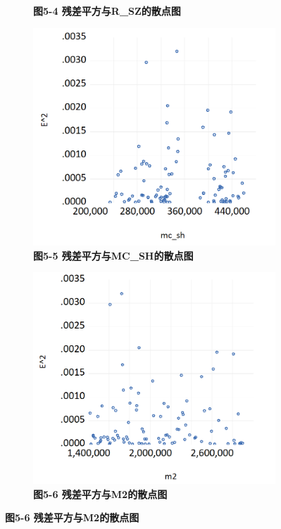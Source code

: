 \documentclass[12pt, a4paper]{article}
\numberwithin{equation}{section}
\begin{document}
\begin{figure}[h!]
\begin{subfigure}{0.45\textwidth}
        \captionsetup{labelformat=empty}
        \caption{\textbf{\fontsize{9pt}{11pt}\selectfont 图5-4 残差平方与R\_SZ的散点图}}
    \end{subfigure}
    \vspace{0.05\textwidth}
    \begin{subfigure}{0.45\textwidth}
        \includegraphics[width=\textwidth]{./img/mc_sh-e2.png}
        \captionsetup{labelformat=empty}
        \caption{\textbf{\fontsize{9pt}{11pt}\selectfont 图5-5 残差平方与MC\_SH的散点图}}
    \end{subfigure}
    \hspace{0.05\textwidth}
    \begin{subfigure}{0.45\textwidth}
        \includegraphics[width=\textwidth]{./img/m2-e2.png}
        \captionsetup{labelformat=empty}
        \caption{\textbf{\fontsize{9pt}{11pt}\selectfont 图5-6 残差平方与M2的散点图}}
    \end{subfigure}
    \captionsetup{labelformat=empty}
\end{figure}
\end{document}

